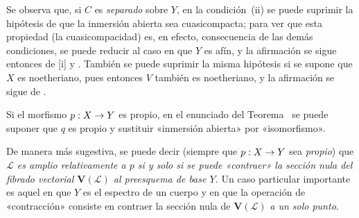 \documentclass[oneside,10pt]{amsart}
\makeatletter
\newcommand{\ega@arrow}[2]{\mathchoice{#1}{#2}{#2}{#2}}
\renewcommand{\to}{\ega@arrow{\longrightarrow}{\rightarrow}}
\newcommand{\oldpage}[2][]{\marginnote{\normalfont\footnotesize\textbf{#1}~|~#2}\ignorespaces}
\let\EGAOriginalLabel\label
\renewcommand{\label}[1]{\phantomsection\EGAOriginalLabel{#1}}
\makeatother
\begin{document}
Se observa que, si $C$ es \emph{separado} sobre $Y$, en la condición~(ii) se puede suprimir la hipótesis de que la inmersión abierta sea cuasicompacta;
para ver que esta propiedad (la cuasicompacidad) es, en efecto, consecuencia de las demás condiciones, se puede reducir al caso en que $Y$ es afín, y la afirmación se sigue entonces de [i] y .
También se puede suprimir
\oldpage[II]{183}
la misma hipótesis si se supone que $X$ es noetheriano, pues entonces $V$ también es noetheriano, y la afirmación se sigue de .

\begin{corollary}[8.9.2]
\label{II.8.9.2-fr}
Si el morfismo $p:X\to Y$ es propio, en el enunciado del Teorema~ se puede suponer que $q$ es propio y sustituir «inmersión abierta» por «isomorfismo».
\end{corollary}

De manera más sugestiva, se puede decir (siempre que $p:X\to Y$ sea \emph{propio}) que \emph{$\mathcal{L}$ es amplio relativamente a $p$ si y solo si se puede «\emph{contraer}» la sección nula del fibrado vectorial $\mathbf{V}(\mathcal{L})$ al preesquema de base $Y$.}
Un caso particular importante es aquel en que $Y$ es el espectro de un cuerpo y en que la operación de «contracción» consiste en contraer la sección nula de $\mathbf{V}(\mathcal{L})$ \emph{a un solo punto}.
\end{document}
